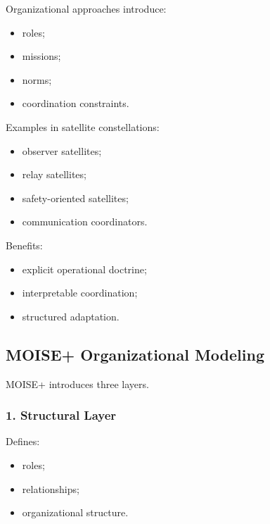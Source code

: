 \documentclass[10pt,a4paper,twocolumn]{article}
\begin{document}
Organizational approaches introduce:
\begin{itemize}
    \item roles;
    \item missions;
    \item norms;
    \item coordination constraints.
\end{itemize}

Examples in satellite constellations:
\begin{itemize}
    \item observer satellites;
    \item relay satellites;
    \item safety-oriented satellites;
    \item communication coordinators.
\end{itemize}

Benefits:
\begin{itemize}
    \item explicit operational doctrine;
    \item interpretable coordination;
    \item structured adaptation.
\end{itemize}


\subsection{MOISE+ Organizational Modeling}

MOISE+ introduces three layers.


\subsubsection*{1. Structural Layer}

Defines:
\begin{itemize}
    \item roles;
    \item relationships;
    \item organizational structure.
\end{itemize}

\end{document}
